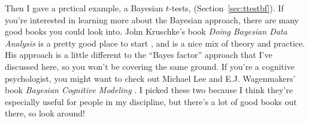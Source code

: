 Then I gave a prctical example, a Bayesian $t$-tests, (Section~\ref{sec:ttestbf}). If you're interested in learning more about the Bayesian approach, there are many good books you could look into. John Kruschke's book {\it Doing Bayesian Data Analysis} is a pretty good place to start \parencite{Kruschke2011}, and is a nice mix of theory and practice. His approach is a little different to the ``Bayes factor'' approach that I've discussed here, so you won't be covering the same ground. If you're a cognitive psychologist, you might want to check out Michael Lee and E.J. Wagenmakers' book {\it Bayesian Cognitive Modeling} \parencite{Lee2014}. I picked these two because I think they're especially useful for people in my discipline, but there's a lot of good books out there, so look around!




